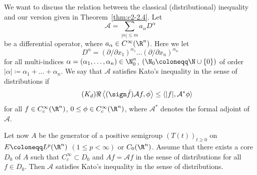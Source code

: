 We want to discuss the relation between the classical (distributional) inequality and our version given in Theorem~\ref{thm:c2-2.4}.
Let 
\[
\mathcal{A} =  \sum_{|\alpha| \leq m} a_{\alpha} D^{\alpha}
\]
be a differential operator, where $a_{\alpha} \in C^{\infty}(\R^n)$.
Here we let 
\[
D^{\alpha} = (\partial/\partial x_1)^{\alpha_1} \ldots (\partial/\partial x_{n})^{\alpha_{n}}
\]
for all multi-indices $\alpha = (\alpha_1,\ldots,\alpha_{n}) \in \N_{0}^n$, 
$(\N_{0} \coloneqq \N\cup\{0\})$ of order $|\alpha| \coloneqq \alpha_1 + \ldots + \alpha_{n}$.
We say that $\mathcal{A}$ satisfies Kato's inequality in the sense of distributions if
\begin{equation}\label{eq:c2-Kd} \tag{$K_{d}$}
\Re\left\langle(\sign \bar{f})\mathcal{A}f, \phi \right\rangle \leq \langle|f|, \mathcal{A}^{*}\phi \rangle
\end{equation}
for all $f \in C_{c}^{\infty}(\R^n)$, $0 \leq \phi \in C_{c}^{\infty}(\R^n)$, where $\mathcal{A}^{*}$ denotes the formal adjoint of\/ $\mathcal{A}$. 

Let now $A$ be the generator of a positive semigroup $(T(t))_{t \geq 0}$ on $E \coloneqq L^p(\R^n)$ $(1 \leq p < \infty)$ or $C_{0}(\R^n)$.
Assume that there exists a core
$D_{0}$ of\/ $A$ such that $C_{c}^{\infty} \subset D_{0}$ and $Af = \mathcal{A}f$ in the sense of distributions for all $f \in D_{0}$.
Then $\mathcal{A}$ satisfies Kato's inequality in the sense of distributions.

